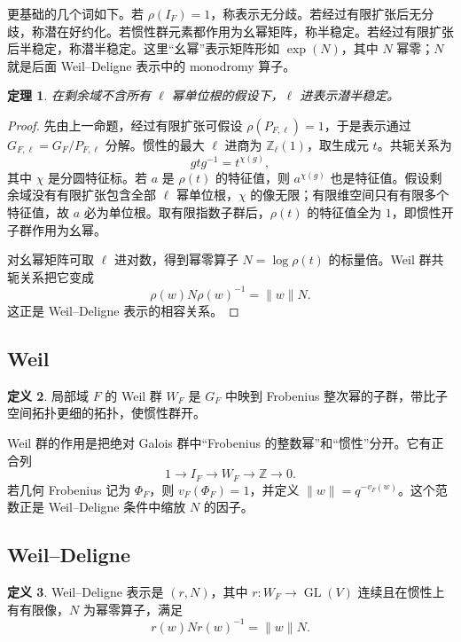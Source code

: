 \documentclass[11pt,a4paper,openany]{ctexbook}
\numberwithin{equation}{chapter}
\newcommand{\Z}{\mathbb{Z}}
\newcommand{\GL}{\operatorname{GL}}
\theoremstyle{plain}
\newtheorem{theorem}{定理}[chapter]
\theoremstyle{definition}
\newtheorem{definition}[theorem]{定义}
\theoremstyle{remark}
\begin{document}
更基础的几个词如下。若 $\rho(I_F)=1$，称表示无分歧。若经过有限扩张后无分歧，称潜在好约化。若惯性群元素都作用为幺幂矩阵，称半稳定。若经过有限扩张后半稳定，称潜半稳定。这里“幺幂”表示矩阵形如 $\exp(N)$，其中 $N$ 幂零；$N$ 就是后面 Weil--Deligne 表示中的 monodromy 算子。

\begin{theorem}
在剩余域不含所有 $\ell$ 幂单位根的假设下，$\ell$ 进表示潜半稳定。
\end{theorem}

\begin{proof}
先由上一命题，经过有限扩张可假设 $\rho(P_{F,\ell})=1$，于是表示通过 $G_{F,\ell}=G_F/P_{F,\ell}$ 分解。惯性的最大 $\ell$ 进商为 $\Z_\ell(1)$，取生成元 $t$。共轭关系为
\[
  gtg^{-1}=t^{\chi(g)},
\]
其中 $\chi$ 是分圆特征标。若 $a$ 是 $\rho(t)$ 的特征值，则 $a^{\chi(g)}$ 也是特征值。假设剩余域没有有限扩张包含全部 $\ell$ 幂单位根，$\chi$ 的像无限；有限维空间只有有限多个特征值，故 $a$ 必为单位根。取有限指数子群后，$\rho(t)$ 的特征值全为 $1$，即惯性开子群作用为幺幂。

对幺幂矩阵可取 $\ell$ 进对数，得到幂零算子 $N=\log\rho(t)$ 的标量倍。Weil 群共轭关系把它变成
\[
  \rho(w)N\rho(w)^{-1}=\|w\|N.
\]
这正是 Weil--Deligne 表示的相容关系。
\end{proof}

\subsection{Weil}

\begin{definition}
局部域 $F$ 的 Weil 群 $W_F$ 是 $G_F$ 中映到 Frobenius 整次幂的子群，带比子空间拓扑更细的拓扑，使惯性群开。
\end{definition}

Weil 群的作用是把绝对 Galois 群中“Frobenius 的整数幂”和“惯性”分开。它有正合列
\[
  1\to I_F\to W_F\to \Z\to0.
\]
若几何 Frobenius 记为 $\Phi_F$，则 $v_F(\Phi_F)=1$，并定义 $\|w\|=q^{-v_F(w)}$。这个范数正是 Weil--Deligne 条件中缩放 $N$ 的因子。

\subsection{Weil--Deligne}

\begin{definition}
Weil--Deligne 表示是 $(r,N)$，其中 $r:W_F\to\GL(V)$ 连续且在惯性上有有限像，$N$ 为幂零算子，满足
\[
  r(w)Nr(w)^{-1}=\|w\|N.
\]
\end{definition}
\end{document}
